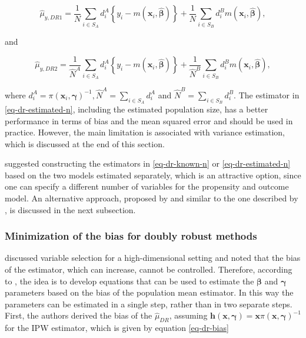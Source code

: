 \documentclass[
]{jss}
\begin{document}
\begin{equation}
\hat{\mu}_{y,DR1}=\frac{1}{N} \sum_{i \in S_{A}} d_i^{A}\left\{y_i-m\left(\boldsymbol{x}_i, \hat{\boldsymbol{\beta}}\right)\right\}+\frac{1}{N} \sum_{i \in S_{B}} d_i^{B} m\left(\boldsymbol{x}_i, \hat{\boldsymbol{\beta}}\right),
\label{eq-dr-known-n}
\end{equation}

and

\begin{equation}
\hat{\mu}_{y,DR2}=\frac{1}{\hat{N}^{A}} \sum_{i \in S_{A}} d_i^{A}\left\{y_i-m\left(\boldsymbol{x}_i, \hat{\boldsymbol{\beta}}\right)\right\}+\frac{1}{\hat{N}^{B}} \sum_{i \in S_{B}} d_i^{B} m\left(\boldsymbol{x}_i, \hat{\boldsymbol{\beta}}\right),
\label{eq-dr-estimated-n}
\end{equation}

where
\(d_i^A=\pi\left(\boldsymbol{x}_i, \boldsymbol{\gamma}\right)^{-1}, \hat{N}^A=\sum_{i \in S_A} d_i^A\)
and \(\hat{N}^B=\sum_{i \in S_B} d_i^B\). The estimator in
\eqref{eq-dr-estimated-n}, including the estimated population size, has
a better performance in terms of bias and the mean squared error and
should be used in practice. However, the main limitation is associated
with variance estimation, which is discussed at the end of this section.

\citet{chen2020doubly} suggested constructing the estimators in
\eqref{eq-dr-known-n} or \eqref{eq-dr-estimated-n} based on the two
models estimated separately, which is an attractive option, since one
can specify a different number of variables for the propensity and
outcome model. An alternative approach, proposed by
\citet{yang_doubly_2020} and similar to the one described by
\citet{kim2014doubly}, is discussed in the next subsection.

\subsubsection{Minimization of the bias for doubly robust
methods}\label{minimization-of-the-bias-for-doubly-robust-methods}

\citet{yang_doubly_2020} discussed variable selection for a
high-dimensional setting and noted that the bias of the estimator, which
can increase, cannot be controlled. Therefore, according to
\citet{yang_doubly_2020}, the idea is to develop equations that can be
used to estimate the \(\boldsymbol{\beta}\) and \(\boldsymbol{\gamma}\)
parameters based on the bias of the population mean estimator. In this
way the parameters can be estimated in a single step, rather than in two
separate steps. First, the authors derived the bias of the
\(\hat{\mu}_{DR}\), assuming
\(\boldsymbol{h}(\boldsymbol{x}, \boldsymbol{\gamma})=\boldsymbol{x}\pi(\boldsymbol{x}, \boldsymbol{\gamma})^{-1}\)
for the IPW estimator, which is given by equation \eqref{eq-dr-bias}
\end{document}
